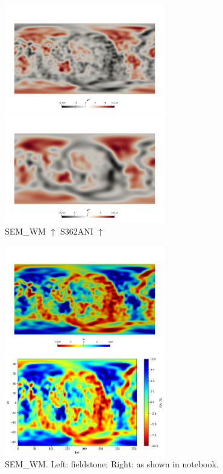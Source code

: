 \begin{center}
\includegraphics[width=7cm]{python_codes/fieldstone_66/images/SEM_WM_s}
\includegraphics[width=7cm]{python_codes/fieldstone_66/images/s362ani_m_s}\\
SEM\_WM $\uparrow$ \hspace{7cm} S362ANI $\uparrow$\\
\end{center}


\begin{center}
\includegraphics[width=7cm]{python_codes/fieldstone_66/images/SEM_WM_s2}
\includegraphics[width=7cm]{python_codes/fieldstone_66/images/SEM_WS_notebook}\\
{\captionfont SEM\_WM. Left: fieldstone; Right: as shown in notebook.} 
\end{center}

